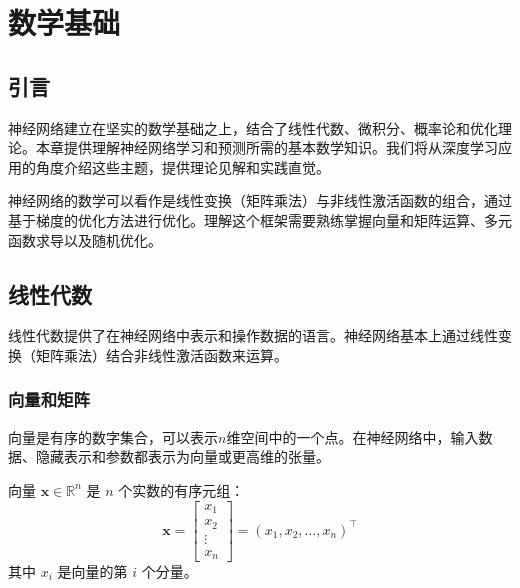 %
%
%

\clearpage
\cleardoublepage

\chapter{数学基础}

\section{引言}

神经网络建立在坚实的数学基础之上，结合了线性代数、微积分、概率论和优化理论。本章提供理解神经网络学习和预测所需的基本数学知识。我们将从深度学习应用的角度介绍这些主题，提供理论见解和实践直觉。

神经网络的数学可以看作是线性变换（矩阵乘法）与非线性激活函数的组合，通过基于梯度的优化方法进行优化。理解这个框架需要熟练掌握向量和矩阵运算、多元函数求导以及随机优化。

\section{线性代数}

线性代数提供了在神经网络中表示和操作数据的语言。神经网络基本上通过线性变换（矩阵乘法）结合非线性激活函数来运算。

\subsection{向量和矩阵}

向量是有序的数字集合，可以表示$n$维空间中的一个点。在神经网络中，输入数据、隐藏表示和参数都表示为向量或更高维的张量。

\begin{definition}[向量]
向量 $\mathbf{x} \in \mathbb{R}^n$ 是 $n$ 个实数的有序元组：
\begin{equation}
\mathbf{x} = \begin{bmatrix} x_1 \\ x_2 \\ \vdots \\ x_n \end{bmatrix} = (x_1, x_2, \ldots, x_n)^\top
\end{equation}
其中 $x_i$ 是向量的第 $i$ 个分量。
\end{definition}

